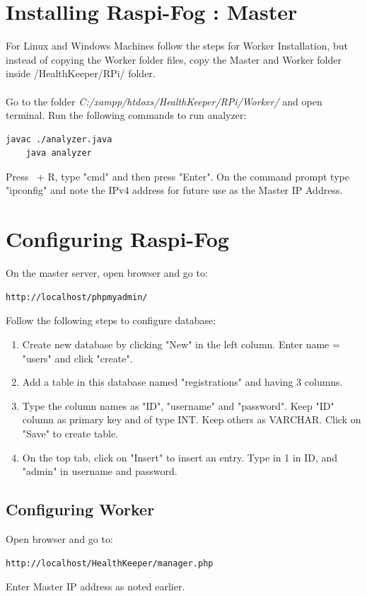 \documentclass{article}
\begin{document}
\section{Installing Raspi-Fog : Master}

For Linux and Windows Machines follow the steps for Worker Installation, but instead of copying the Worker folder files, copy the Master and Worker folder inside /HealthKeeper/RPi/ folder.\\ \\
Go to the folder \textit{C:/xampp/htdoxs/HealthKeeper/RPi/Worker/} and open terminal. Run the following commands to run analyzer:
\begin{lstlisting}[style=BashInputStyle]
    javac ./analyzer.java
    java analyzer
\end{lstlisting}
Press \faWindows \ + R, type "cmd" and then press "Enter". On the command prompt type "ipconfig" and note the IPv4 address for future use as the Master IP Address.

\section{Configuring Raspi-Fog}

On the master server, open browser and go to:
\begin{lstlisting}[style=BashInputStyle]
    http://localhost/phpmyadmin/
\end{lstlisting}
Follow the following steps to configure database:
\begin{enumerate}
\item Create new database by clicking "New" in the left column. Enter name = "users" and click "create".
\item Add a table in this database named "registrations" and having 3 columns.
\item Type the column names as "ID", "username" and "password". Keep "ID" column as primary key and of type INT. Keep others as VARCHAR. Click on "Save" to create table.
\item On the top tab, click on "Insert" to insert an entry. Type in 1 in ID, and "admin" in username and password.
\end{enumerate}

\subsection{Configuring Worker}
Open browser and go to:
\begin{lstlisting}[style=BashInputStyle]
    http://localhost/HealthKeeper/manager.php
\end{lstlisting}
Enter Master IP address as noted earlier.
\end{document}
